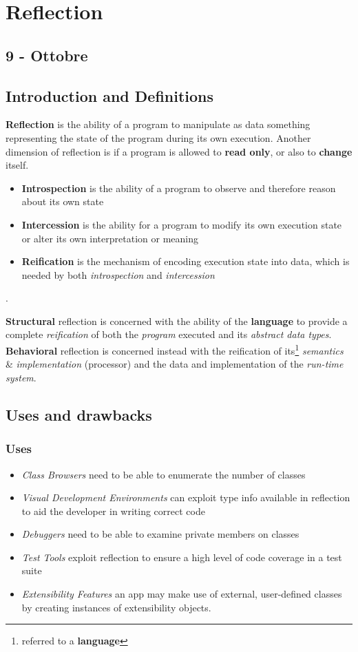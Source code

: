 \chapter{Reflection}
\section*{9 - Ottobre}
\section{Introduction and Definitions}

\textbf{Reflection} is the ability of a program to manipulate as data something representing the state of the program during its own execution.
Another dimension of reflection is if a program is
allowed to \textbf{read only}, or also to \textbf{change} itself.
\begin{itemize}
    \item \textbf{Introspection} is the ability of a program to observe and
    therefore reason about its own state
    \item \textbf{Intercession} is the ability for a program to modify its
    own execution state or alter its own interpretation or
    meaning
    \item \textbf{Reification} is the mechanism of encoding execution state into data, which is needed by both \textit{introspection} and \textit{intercession}
\end{itemize}.

\textbf{Structural} reflection  is concerned with the ability of the \textbf{language} to provide a complete \textit{reification} of both the \textit{program} executed and its \textit{abstract data types}.\\
\textbf{Behavioral} reflection is concerned instead with the reification of its\footnote{referred to a \textbf{language}} \textit{semantics} \& \textit{implementation} (processor) and the data and implementation of the \textit{run-time system}.

\section{Uses and drawbacks}
\subsection{Uses}
\begin{itemize}
    \item \textit{Class Browsers} need to be able to enumerate the number of classes
    \item \textit{Visual Development Environments} can exploit type info available in reflection to aid the developer in writing correct code
    \item \textit{Debuggers} need to be able to examine private members on classes
    \item \textit{Test Tools} exploit reflection to ensure a high level of code coverage in a test suite
    \item \textit{Extensibility Features} an app may make use of external, user-defined classes by creating instances of extensibility objects.
\end{itemize}

